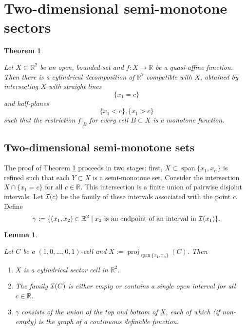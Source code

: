 \documentclass[
]{book}
\providecommand{\tightlist}{%
  \setlength{\itemsep}{0pt}\setlength{\parskip}{0pt}}
\newtheorem{theorem}{Theorem}[chapter]
\newtheorem{lemma}{Lemma}[chapter]
\theoremstyle{definition}
\theoremstyle{definition}
\theoremstyle{definition}
\theoremstyle{definition}
\theoremstyle{remark}
\begin{document}
\hypertarget{two-dimensional-semi-monotone-sectors}{%
\section{Two-dimensional semi-monotone sectors}\label{two-dimensional-semi-monotone-sectors}}

\begin{theorem}
\protect\hypertarget{thm:bgv-monotone}{}\label{thm:bgv-monotone}\citep[Lemma 3.18]{bgv15}

Let \(X \subset \mathbb{R}^2\) be an open, bounded set and \(f : X \to \mathbb{R}\) be a quasi-affine function.
Then there is a cylindrical decomposition of \(\mathbb{R}^2\) compatible with \(X\), obtained by intersecting \(X\) with straight lines \[\{x_1 = c\}\] and half-planes \[\{x_1 < c\},\{x_1 > c\}\] such that the restriction \(f\vert_B\) for every cell \(B \subset X\) is a monotone function.
\end{theorem}

\hypertarget{semi-monotone-sets}{%
\subsection{Two-dimensional semi-monotone sets}\label{semi-monotone-sets}}

The proof of Theorem \ref{thm:bgv-monotone} proceeds in two stages: first, \(X \subset {\operatorname{span} \{x_1,x_\alpha\}}\) is refined such that each \(Y \subset X\) is a semi-monotone set.
Consider the intersection \(X \cap \{x_1 = c\}\) for all \(c\in \mathbb{R}\). This intersection is a finite union of pairwise disjoint intervals. Let \({\cal I} (c)\) be the family of these intervals associated with the point \(c\). Define
\[
\gamma := \{ (x_1,x_2) \in \mathbb{R}^2 \mid x_2 \text{ is an endpoint of an interval in } {\cal I}(x_1) \}.
\]

\begin{lemma}
\protect\hypertarget{lem:gamma-top-bottom}{}\label{lem:gamma-top-bottom}

Let \(C\) be a \((1,0,\ldots,0,1)\)-cell and \(X := {\operatorname{proj}_{{\operatorname{span} \{x_1,x_\alpha\}}}} (C)\). Then

\begin{enumerate}
\def\labelenumi{\arabic{enumi}.}
\tightlist
\item
  \(X\) is a cylindrical sector cell in \(\mathbb{R}^2\).
\item
  The family \({\cal I}(C)\) is either empty or contains a single open interval for all \(c\in \mathbb{R}\).
\item
  \(\gamma\) consists of the union of the top and bottom of \(X\), each of which (if non-empty) is the graph of a continuous definable function.
\end{enumerate}

\end{lemma}
\end{document}
